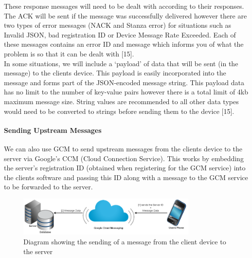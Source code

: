 \documentclass{article}
\begin{document}
These response messages will need to be dealt with according to their responses. The ACK will be sent if the message was successfully delivered however there are two types of error messages (NACK and Stanza error) for situations such as Invalid JSON, bad registration ID or Device Message Rate Exceeded. Each of these messages contains an error ID and message which informs you of what the problem is so that it can be dealt with [15].\\

In some situations, we will include a ‘payload’ of data that will be sent (in the message) to the clients device. This payload is easily incorporated into the message and forms part of the JSON-encoded message string. This payload data has no limit to the number of key-value pairs however there is a total limit of 4kb maximum message size. String values are recommended to all other data types would need to be converted to strings before sending them to the device [15].\\
		
		\paragraph{Sending Upstream Messages}
		We can also use GCM to send upstream messages from the clients device to the server via Google’s CCM (Cloud Connection Service). This works by embedding the server’s registration ID (obtained when registering for the GCM service) into the clients software and passing this ID along with a message to the GCM service to be forwarded to the server.\\
		
	\begin{figure}[H]
		\centering
		\includegraphics[width=0.8\textwidth]{"GSM Sending a message upstream"}
		\caption{Diagram showing the sending of a message from the client device to the server}
	\end{figure}
	
\end{document}
